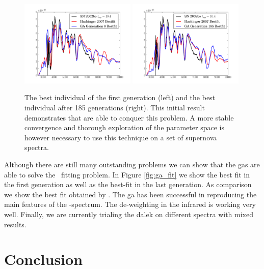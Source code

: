 \begin{figure}[tb] %
   \centering
   \includegraphics[width=0.49\textwidth]{chapter_dalek/plots/plot_ga0_speccompare.pdf} 
   \includegraphics[width=0.49\textwidth]{chapter_dalek/plots/plot_ga185_speccompare.pdf} 
   \caption[Results of optimizations with Genetic Algorithms]{The best individual of the first generation (left) and the best individual after 185 generations (right). This initial result demonstrates that  are able to conquer this problem. A more stable convergence and thorough exploration of the parameter space is however necessary to use this technique on a set of supernova spectra.}
   \label{fig:example}
\end{figure}

Although there are still many outstanding problems we can show that the \glspl{ga} are able to solve the \sneia\ fitting problem. In Figure \ref{fig:ga_fit} we show the best fit in the first generation as well as the best-fit in the last generation. As comparison we show the best fit obtained by \citet{hachinger_dipl2007}. The \gls{ga} has been successful in reproducing the main features of the \sneia-spectrum. The de-weighting in the infrared is working very well. Finally, we are currently trialing the \gls{dalek} on different spectra with mixed results. 


\section{Conclusion}
\label{sec:dalek_conclusion}


